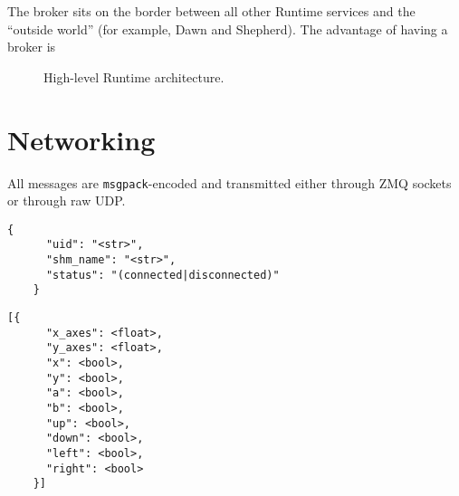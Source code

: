 \documentclass[12pt]{book}
\begin{document}

  The broker sits on the border between all other Runtime services and the ``outside world'' (for example, Dawn and Shepherd).
  The advantage of having a broker is

  \begin{figure}[!htbp]
    \centering
    \caption{High-level Runtime architecture.}
    \label{fig:runtime-architecture}
  \end{figure}

  \section{Networking}

  All messages are \texttt{msgpack}-encoded and transmitted either through ZMQ sockets or through raw UDP.

  \begin{lstlisting}[gobble=4, caption={\texttt{device-event} message (Unix socket published by \texttt{devices})}]
    {
      "uid": "<str>",
      "shm_name": "<str>",
      "status": "(connected|disconnected)"
    }
  \end{lstlisting}

  \begin{lstlisting}[gobble=4, caption={\texttt{gamepad} message (UDP from Dawn to Runtime)}]
    [{
      "x_axes": <float>,
      "y_axes": <float>,
      "x": <bool>,
      "y": <bool>,
      "a": <bool>,
      "b": <bool>,
      "up": <bool>,
      "down": <bool>,
      "left": <bool>,
      "right": <bool>
    }]
  \end{lstlisting}
\end{document}
